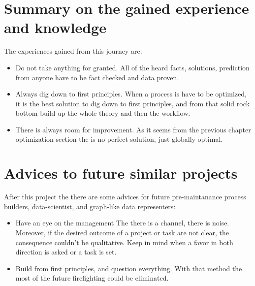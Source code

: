 \section{Summary on the gained experience and knowledge}
The experiences gained from this journey are:
\begin{itemize}
	\item{Do not take anything for granted.} All of the heard facts, solutions, prediction from anyone have to be fact checked and data proven.
	\item{Always dig down to first principles.} When a process is have to be optimized, it is the best solution to dig down to first principles, and from that solid rock bottom build up the whole theory and then the workflow.
	\item{There is always room for improvement.} As it seems from the previous chapter optimization section the is no perfect solution, just globally optimal. 
\end{itemize}
\section{Advices to future similar projects}
After this project the there are some advices for future pre-maintanance process builders, data-scientist, and graph-like data representers:
\begin{itemize}
	\item{Have an eye on the management} The there is a channel, there is noise. Moreover, if the desired outcome of a project or task are not clear, the consequence couldn't be qualitative. Keep in mind when a favor in both direction is asked or a task is set.
	\item{Build from first principles, and question everything.} With that method the most of the future firefighting could be eliminated.
\end{itemize}